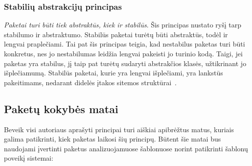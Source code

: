 \subsubsection{Stabilių abstrakcijų principas}
\textit{Paketai turi būti tiek abstraktūs, kiek ir stabilūs}.
Šis principas nustato ryšį tarp stabilumo ir abstraktumo.
Stabilūs paketai turėtų būti abstraktūs, todėl ir lengvai praplečiami.
Tai pat šis principas teigia, kad nestabilus paketas turi būti konkretus, nes jo nestabilumas leidžia lengvai pakeisti jo turinio kodą.
Taigi, jei paketas yra stabilus, jį taip pat turėtų sudaryti abstrakčios klasės, užtikrinant jo išplečiamumą.
Stabilūs paketai, kurie yra lengvai išplečiami, yra lankstūs pakeitimams, nedarant didelės įtakos sitemos struktūrai~\cite{AgileSoftwareDevelopment}.

\subsection{Paketų kokybės matai}
Beveik visi autoriaus aprašyti principai turi aiškiai apibrėžtus matus, kuriais galima patikrinti, kiek paketas laikosi šių principų.
Būtent šie matai bus naudojami įvertinti paketus analizuojamuose šablonuose norint patikrinti šablonų poveikį sistemai:
